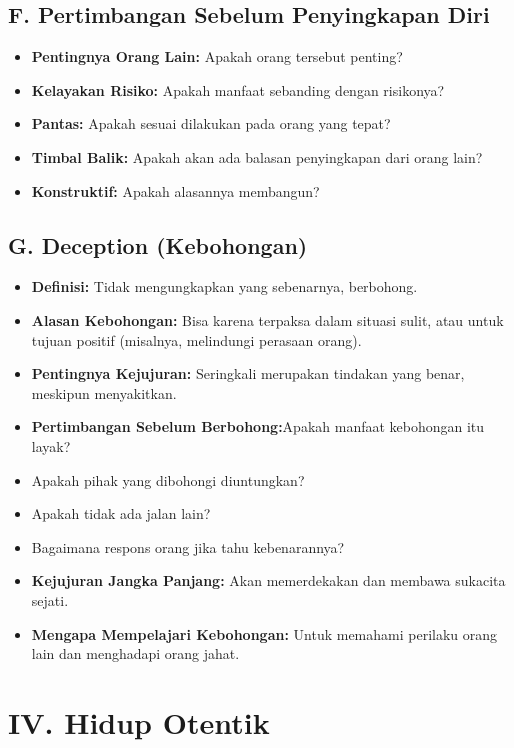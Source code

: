 \documentclass[
  letterpaper,
  DIV=11,
  numbers=noendperiod]{scrreprt}
\providecommand{\tightlist}{%
  \setlength{\itemsep}{0pt}\setlength{\parskip}{0pt}}
\begin{document}
\subsection{F. Pertimbangan Sebelum Penyingkapan
Diri}\label{f.-pertimbangan-sebelum-penyingkapan-diri}

\begin{itemize}
\tightlist
\item
  \textbf{Pentingnya Orang Lain:} Apakah orang tersebut penting?
\item
  \textbf{Kelayakan Risiko:} Apakah manfaat sebanding dengan risikonya?
\item
  \textbf{Pantas:} Apakah sesuai dilakukan pada orang yang tepat?
\item
  \textbf{Timbal Balik:} Apakah akan ada balasan penyingkapan dari orang
  lain?
\item
  \textbf{Konstruktif:} Apakah alasannya membangun?
\end{itemize}

\subsection{G. Deception (Kebohongan)}\label{g.-deception-kebohongan}

\begin{itemize}
\tightlist
\item
  \textbf{Definisi:} Tidak mengungkapkan yang sebenarnya, berbohong.
\item
  \textbf{Alasan Kebohongan:} Bisa karena terpaksa dalam situasi sulit,
  atau untuk tujuan positif (misalnya, melindungi perasaan orang).
\item
  \textbf{Pentingnya Kejujuran:} Seringkali merupakan tindakan yang
  benar, meskipun menyakitkan.
\item
  \textbf{Pertimbangan Sebelum Berbohong:}Apakah manfaat kebohongan itu
  layak?
\item
  Apakah pihak yang dibohongi diuntungkan?
\item
  Apakah tidak ada jalan lain?
\item
  Bagaimana respons orang jika tahu kebenarannya?
\item
  \textbf{Kejujuran Jangka Panjang:} Akan memerdekakan dan membawa
  sukacita sejati.
\item
  \textbf{Mengapa Mempelajari Kebohongan:} Untuk memahami perilaku orang
  lain dan menghadapi orang jahat.
\end{itemize}

\section{IV. Hidup Otentik}\label{iv.-hidup-otentik}
\end{document}

